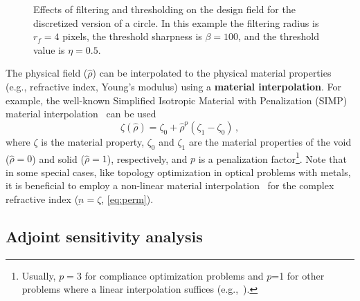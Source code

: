     \begin{figure}[tb]
        \centering

        \caption{Effects of filtering and thresholding on the design field for the discretized
        version of a circle. In this example the filtering radius is $r_f=4$ pixels, the threshold sharpness is 
        $\beta=100$, and the threshold value is $\eta=0.5$.}
        \label{fig:ft}
    \end{figure}

    The physical field ($\hat{\rho}$) can be interpolated to the physical material properties (e.g., refractive index, Young's
    modulus) using a
    \textbf{material interpolation}. For example, the well-known Simplified Isotropic Material with Penalization (SIMP) material interpolation~\cite{SIMP} can be used
    \begin{equation}\label{eq:SIMP}
        \zeta(\hat{\rho})=\zeta_0+\hat{\rho}^p\left(\zeta_1-\zeta_0\right)\,,
    \end{equation}
 where $\zeta$ is the material property, $\zeta_0$ and $\zeta_1$ are the
 material properties of the void ($\hat{\rho}=0$) and solid ($\hat{\rho}=1$), respectively, and $p$
 is a penalization factor\footnote{Usually, $p=3$ for compliance optimization problems and $p$=1
 for other problems where a linear interpolation suffices (e.g.,~\cite{ownpub3,ownpub4}).}. Note that in some
 special cases, like topology optimization in optical problems with metals, it is beneficial
 to employ a non-linear material interpolation~\cite{nonlinear_interp,ownpub0} for the complex refractive index ($\underbar{n}=\zeta$, \eqref{eq:perm}).

    \subsection*{Adjoint sensitivity analysis}

